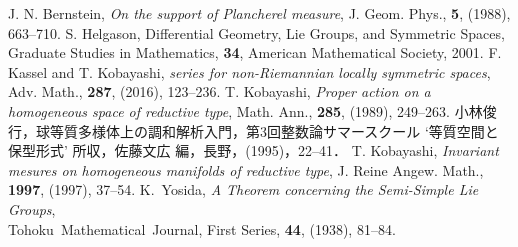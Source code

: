 \documentclass[12pt,dvipdfmx,uplatex]{jsarticle}
\begin{document}
\begin{thebibliography}{99}
  \vspace{-0.5em}
 J. N. Bernstein, \textit{On the support of Plancherel measure}, J. Geom. Phys., \textbf{5}, (1988), 663--710.
 S. Helgason, Differential Geometry, Lie Groups, and Symmetric Spaces, Graduate Studies in Mathematics, \textbf{34}, American Mathematical Society, 2001.
 F. Kassel and T. Kobayashi, \textit{{\Poincare} series for non-Riemannian locally symmetric spaces}, Adv. Math., \textbf{287}, (2016), 123--236.
 T. Kobayashi, 
  \textit{Proper action on a homogeneous space of reductive type},
  Math. Ann., \textbf{285}, (1989), 249--263.  
 小林俊行，球等質多様体上の調和解析入門，第3回整数論サマースクール `等質空間と保型形式' 所収，佐藤文広 編，長野，(1995)，22--41．
 T. Kobayashi, \textit{Invariant mesures on homogeneous manifolds of reductive type}, J. Reine Angew. Math., \textbf{1997}, (1997), 37--54.
 K.~Yosida, \textit{A Theorem concerning the Semi-Simple Lie Groups}, \\Tohoku~Mathematical~Journal, First Series, \textbf{44}, (1938), 81--84.
\end{thebibliography}
\end{document}
